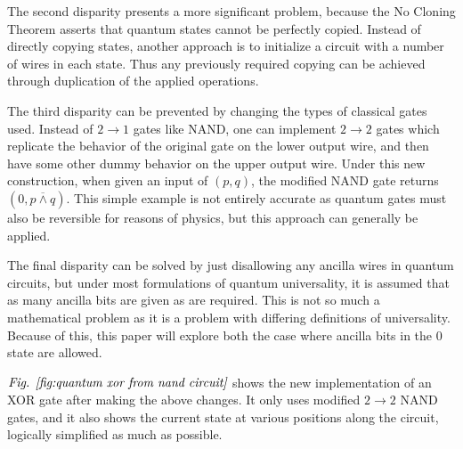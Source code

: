 \documentclass[12pt]{article}
\newcommand{\nand}{\overline{\land}}
\begin{document}
The second disparity presents a more significant problem, because the No Cloning Theorem asserts that quantum states cannot be perfectly copied. Instead of directly copying states, another approach is to initialize a circuit with a number of wires in each state. Thus any previously required copying can be achieved through duplication of the applied operations.

The third disparity can be prevented by changing the types of classical gates used. Instead of $2 \to 1$ gates like NAND, one can implement $2 \to 2$ gates which replicate the behavior of the original gate on the lower output wire, and then have some other dummy behavior on the upper output wire. Under this new construction, when given an input of $(p, q)$, the modified NAND gate returns $(0, p \nand q)$. This simple example is not entirely accurate as quantum gates must also be reversible for reasons of physics, but this approach can generally be applied.

The final disparity can be solved by just disallowing any ancilla wires in quantum circuits, but under most formulations of quantum universality, it is assumed that as many ancilla bits are given as are required. This is not so much a mathematical problem as it is a problem with differing definitions of universality. Because of this, this paper will explore both the case where ancilla bits in the 0 state are allowed.

$\emph{Fig. \ref{fig:quantum xor from nand circuit}}$ shows the new implementation of an XOR gate after making the above changes. It only uses modified $2 \to 2$ NAND gates, and it also shows the current state at various positions along the circuit, logically simplified as much as possible.
\end{document}

